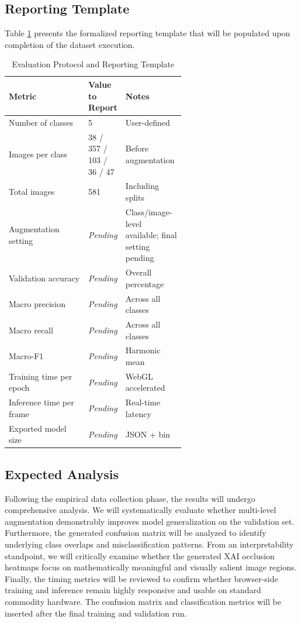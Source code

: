 \documentclass[conference]{IEEEtran}
\begin{document}
\subsection{Reporting Template}
Table \ref{tab:evaluation_metrics} presents the formalized reporting template that will be populated upon completion of the dataset execution.

\begin{table}[ht]
\centering
\caption{Evaluation Protocol and Reporting Template}
\label{tab:evaluation_metrics}
\begin{tabularx}{\linewidth}{@{}p{0.45\linewidth} p{0.15\linewidth} X@{}}
\toprule
\textbf{Metric} & \textbf{Value to Report} & \textbf{Notes} \\
\midrule
Number of classes & 5 & User-defined \\
Images per class & 38 / 357 / 103 / 36 / 47 & Before augmentation \\
Total images & 581 & Including splits \\
Augmentation setting & \textit{Pending} & Class/image-level available; final setting pending \\
Validation accuracy & \textit{Pending} & Overall percentage \\
Macro precision & \textit{Pending} & Across all classes \\
Macro recall & \textit{Pending} & Across all classes \\
Macro-F1 & \textit{Pending} & Harmonic mean \\
Training time per epoch & \textit{Pending} & WebGL accelerated \\
Inference time per frame & \textit{Pending} & Real-time latency \\
Exported model size & \textit{Pending} & JSON + bin \\
\bottomrule
\end{tabularx}
\end{table}

\subsection{Expected Analysis}
Following the empirical data collection phase, the results will undergo comprehensive analysis. We will systematically evaluate whether multi-level augmentation demonstrably improves model generalization on the validation set. Furthermore, the generated confusion matrix will be analyzed to identify underlying class overlaps and misclassification patterns. From an interpretability standpoint, we will critically examine whether the generated XAI occlusion heatmaps focus on mathematically meaningful and visually salient image regions. Finally, the timing metrics will be reviewed to confirm whether browser-side training and inference remain highly responsive and usable on standard commodity hardware. The confusion matrix and classification metrics will be inserted after the final training and validation run.
\end{document}
